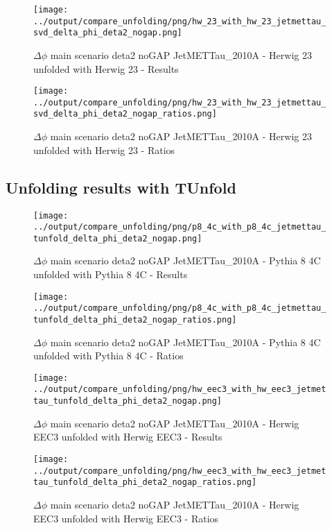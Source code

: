 \documentclass[11pt]{book}
\begin{document}
\begin{figure}[ht]
\centering
\texttt{[image: ../output/compare\_unfolding/png/hw\_23\_with\_hw\_23\_jetmettau\_svd\_delta\_phi\_deta2\_nogap.png]}
\caption{$\Delta\phi$ main scenario deta2 noGAP JetMETTau\_2010A - Herwig 23 unfolded with Herwig 23 - Results}
\label{hw_23_hw_23_jetmettau_svd_delta_phi_deta2_nogap_a}
\end{figure}

\begin{figure}[ht]
\centering
\texttt{[image: ../output/compare\_unfolding/png/hw\_23\_with\_hw\_23\_jetmettau\_svd\_delta\_phi\_deta2\_nogap\_ratios.png]}
\caption{$\Delta\phi$ main scenario deta2 noGAP JetMETTau\_2010A - Herwig 23 unfolded with Herwig 23 - Ratios}
\label{hw_23_hw_23_jetmettau_svd_delta_phi_deta2_nogap_b}
\end{figure}


\clearpage
\subsection{Unfolding results with TUnfold}

\begin{figure}[ht]
\centering
\texttt{[image: ../output/compare\_unfolding/png/p8\_4c\_with\_p8\_4c\_jetmettau\_tunfold\_delta\_phi\_deta2\_nogap.png]}
\caption{$\Delta\phi$ main scenario deta2 noGAP JetMETTau\_2010A - Pythia 8 4C unfolded with Pythia 8 4C - Results}
\label{p8_p8_jetmettau_tunfold_delta_phi_deta2_nogap_a}
\end{figure}

\begin{figure}[ht]
\centering
\texttt{[image: ../output/compare\_unfolding/png/p8\_4c\_with\_p8\_4c\_jetmettau\_tunfold\_delta\_phi\_deta2\_nogap\_ratios.png]}
\caption{$\Delta\phi$ main scenario deta2 noGAP JetMETTau\_2010A - Pythia 8 4C unfolded with Pythia 8 4C - Ratios}
\label{p8_p8_jetmettau_tunfold_delta_phi_deta2_nogap_b}
\end{figure}

\begin{figure}[ht]
\centering
\texttt{[image: ../output/compare\_unfolding/png/hw\_eec3\_with\_hw\_eec3\_jetmettau\_tunfold\_delta\_phi\_deta2\_nogap.png]}
\caption{$\Delta\phi$ main scenario deta2 noGAP JetMETTau\_2010A - Herwig EEC3 unfolded with Herwig EEC3 - Results}
\label{hw_eec3_hw_eec3_jetmettau_tunfold_delta_phi_deta2_nogap_a}
\end{figure}

\begin{figure}[ht]
\centering
\texttt{[image: ../output/compare\_unfolding/png/hw\_eec3\_with\_hw\_eec3\_jetmettau\_tunfold\_delta\_phi\_deta2\_nogap\_ratios.png]}
\caption{$\Delta\phi$ main scenario deta2 noGAP JetMETTau\_2010A - Herwig EEC3 unfolded with Herwig EEC3 - Ratios}
\label{hw_eec3_hw_eec3_jetmettau_tunfold_delta_phi_deta2_nogap_b}
\end{figure}
\end{document}
